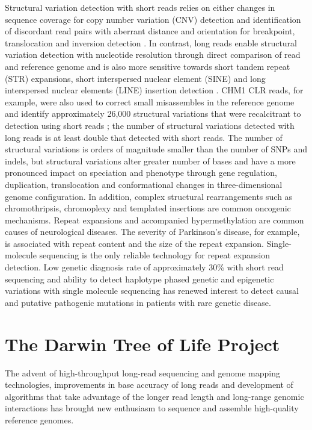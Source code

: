 Structural variation detection with short reads relies on either changes in sequence coverage for copy number variation (CNV) detection and identification of discordant read pairs with aberrant distance and orientation for breakpoint, translocation and inversion detection \cite{Alkan2011-dv}. In contrast, long reads enable structural variation detection with nucleotide resolution through direct comparison of read and reference genome and is also more sensitive towards short tandem repeat (STR) expansions, short interspersed nuclear element (SINE) and long interspersed nuclear elements (LINE) insertion detection \cite{Chaisson2015-zz, Sedlazeck2018-oh, Denti2022-ux}. CHM1 CLR reads, for example, were also used to correct small misassembles in the reference genome and identify approximately 26,000 structural variations that were recalcitrant to detection using short reads \cite{Chaisson2015-zz}; the number of structural variations detected with long reads is at least double that detected with short reads. The number of structural variations is orders of magnitude smaller than the number of SNPs and indels, but structural variations alter greater number of bases and have a more pronounced impact on speciation and phenotype through gene regulation, duplication, translocation\cite{Weischenfeldt2013-tl} and conformational changes in three-dimensional genome configuration\cite{Spielmann2018-fm,}. In addition, complex structural rearrangements such as chromothripsis\cite{Stephens2011-gj, Korbel2013-to}, chromoplexy\cite{Baca2013-po} and templated insertions\cite{Yu2010-jr} are common oncogenic mechanisms. Repeat expansions and accompanied hypermethylation are common causes of neurological diseases\cite{Zhou2022-ci}. The severity of Parkinson’s disease, for example, is associated with repeat content and the size of the repeat expansion\cite{}. Single-molecule sequencing is the only reliable technology for repeat expansion detection. Low genetic diagnosis rate of approximately 30\% with short read sequencing and ability to detect haplotype phased genetic and epigenetic variations with single molecule sequencing has renewed interest to detect causal and putative pathogenic mutations in patients with rare genetic disease\cite{}. 

\section{The Darwin Tree of Life Project}

The advent of high-throughput long-read sequencing\cite{} and genome mapping technologies\cite{}, improvements in base accuracy of long reads \cite{Wenger2019-pw} and development of algorithms that take advantage of the longer read length and long-range genomic interactions \cite{Dudchenko2017-kb} has brought new enthusiasm to sequence and assemble high-quality reference genomes\cite {}. 

